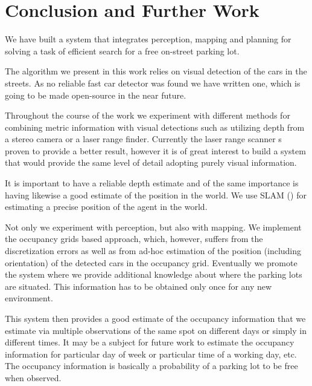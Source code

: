 
\chapter{Conclusion and Further Work} %
\label{cha:conclusion_and_further_work}

    We have built a system that integrates perception, mapping and planning
    for solving a task of efficient search for a free on-street parking lot.

    The algorithm we present in this work relies on visual detection of the
    cars in the streets. As no reliable fast car detector was found we have
    written one, which is going to be made open-source in the near future.

    Throughout the course of the work we experiment with different methods for
    combining metric information with visual detections such as utilizing
    depth from a stereo camera or a laser range finder. Currently the laser
    range scanner s proven to provide a better result, however it is of great
    interest to build a system that would provide the same level of detail
    adopting purely visual information.

    It is important to have a reliable depth estimate and of the same
    importance is having likewise a good estimate of the position in the
    world. We use SLAM
    (\cite{stachniss11isrr,kuemmerle11auro,kretzschmar10ki}) for estimating a
    precise position of the agent in the world.

    Not only we experiment with perception, but also with mapping. We
    implement the occupancy grids based approach, which, however, suffers from
    the discretization errors as well as from ad-hoc estimation of the
    position (including orientation) of the detected cars in the occupancy
    grid. Eventually we promote the system where we provide additional
    knowledge about where the parking lots are situated. This information has
    to be obtained only once for any new environment.

    This system then provides a good estimate of the occupancy information
    that we estimate via multiple observations of the same spot on different
    days or simply in different times. It may be a subject for future work to
    estimate the occupancy information for particular day of week or
    particular time of a working day, etc. The occupancy information is
    basically a probability of a parking lot to be free when observed.

